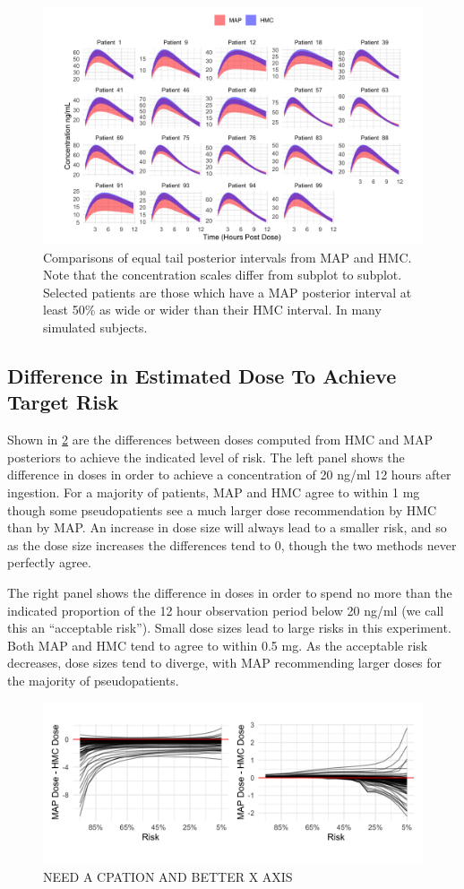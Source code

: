 \begin{figure}
	\centering
	\includegraphics[width=1\linewidth]{figs/intervals}
	\caption{Comparisons of equal tail posterior intervals from MAP and HMC. Note that the concentration scales differ from subplot to subplot.  Selected patients are those which have a MAP posterior interval at least 50\% as wide or wider than their HMC interval.  In many simulated subjects.}
	\label{fig:fig6}
\end{figure}


\subsection*{Difference in Estimated Dose To Achieve Target Risk}


Shown in \cref{fig:fig7} are the differences between doses computed from HMC and MAP posteriors to achieve the indicated level of risk.  The left panel shows the difference in doses in order to achieve a concentration of 20 ng/ml 12 hours after ingestion. For a majority of patients, MAP and HMC agree to within 1 mg though some pseudopatients see a much larger dose recommendation by HMC than by MAP.  An increase in dose size will always lead to a smaller risk, and so as the dose size increases the differences tend to 0, though the two methods never perfectly agree.

The right panel shows the difference in doses in order to spend no more than the indicated proportion of the 12 hour observation period below 20 ng/ml (we call this an “acceptable risk”).  Small dose sizes lead to large risks in this experiment.  Both MAP and HMC tend to agree to within 0.5 mg.  As the acceptable risk decreases, dose sizes tend to diverge, with MAP recommending larger doses for the majority of pseudopatients.

\begin{figure}
	\centering
	\includegraphics[width=\linewidth]{figs/experiments}
	\caption{NEED A CPATION AND BETTER X AXIS}
	\label{fig:fig7}
\end{figure}



